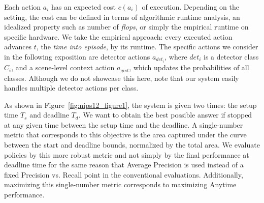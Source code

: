 Each action $a_i$ has an expected cost $c(a_i)$ of execution.
Depending on the setting, the cost can be defined in terms of algorithmic runtime analysis, an idealized property such as number of \emph{flops}, or simply the empirical runtime on specific hardware.
We take the empirical approach: every executed action advances $t$, the \emph{time into episode}, by its runtime.
The specific actions we consider in the following exposition are detector actions $a_{{det}_i}$, where ${det}_i$ is a detector class $C_i$, and a scene-level context action $a_{gist}$, which updates the probabilities of all classes.
Although we do not showcase this here, note that our system easily handles multiple detector actions per class.

As shown in Figure~\ref{fig:nips12_figure1}, the system is given two times: the setup time $T_s$ and deadline $T_d$.
We want to obtain the best possible answer if stopped at any given time between the setup time and the deadline.
A single-number metric that corresponds to this objective is the area captured under the curve between the start and deadline bounds, normalized by the total area.
We evaluate policies by this more robust metric and not simply by the final performance at deadline time for the same reason that Average Precision is used instead of a fixed Precision vs. Recall point in the conventional evaluations.
Additionally, maximizing this single-number metric corresponds to maximizing Anytime performance.
